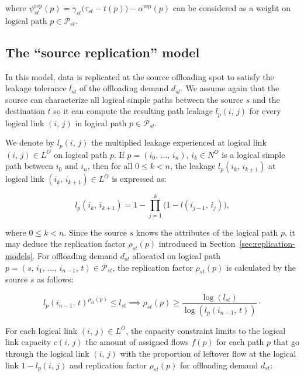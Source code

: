 \noindent where $\psi_{st}^{\text{rep}}(p)=\gamma_{st}\big(\tau_{st}-t(p)\big)-\alpha^{\text{rep}}(p)$ can be considered as a weight on logical path $p\in\mathcal{P}_{st}$.

\subsection{The ``source replication'' model}
\label{sec:nrep-model}

In this model, data is replicated at the source offloading spot to satisfy the leakage tolerance $l_{st}$ of the offloading demand $d_{st}$. We assume again that the source can characterize all logical simple paths between the source $s$ and the destination $t$ so it can compute the resulting path leakage $l_{p}(i,\,j)$ for every logical link $(i,\,j)$ in logical path $p\in\mathcal{P}_{st}$. 

We denote by $l_{p}(i,\,j)$ the multiplied leakage experienced at logical link $(i,\,j)\in L^{O}$ on logical path $p$. If $p=(i_{0},\,\dotsc,\,i_{n}),\,i_{k}\in N^{O}$ is a logical simple path between $i_{0}$ and $i_{n}$, then for all $0 \leq k < n$, the leakage $l_{p}(i_{k},\,i_{k+1})$ at logical link $(i_{k},\,i_{k+1})\in L^{O}$ is expressed as:

\begin{equation}
    l_{p}\left(i_{k},\, i_{k+1}\right)=1-\prod_{j=1}^{k}\big(1 - l\left(i_{j-1},\, i_{j}\right)\big),
\end{equation}

\noindent where $0 \leq k < n$. Since the source $s$ knows the attributes of the logical path $p$, it may deduce the replication factor $\rho_{st}(p)$ introduced in Section~\ref{sec:replication-models}. For offloading demand $d_{st}$ allocated on logical path $p=(s,\,i_{1},\,\dotsc,\,i_{n-1},\,t)\in\mathcal{P}_{st}$, the replication factor $\rho_{st}(p)$ is calculated by the source $s$ as follows:

\begin{equation}
    l_{p}(i_{n-1},\,t)^{\rho_{st}(p)} \leq l_{st} \implies
    \rho_{st}(p) \geq \frac{\log(l_{st})}{\log(l_{p}(i_{n-1},\,t))}\cdot
\end{equation}

For each logical link $(i,\,j)\in L^{O}$, the capacity constraint limits to the logical link capacity $c(i,\,j)$ the amount of assigned flows $f(p)$ for each path $p$ that go through the logical link $(i,\,j)$ with the proportion of leftover flow at the logical link $1 - l_{p}(i,\,j)$ and replication factor $\rho_{st}(p)$ for offloading demand $d_{st}$:

